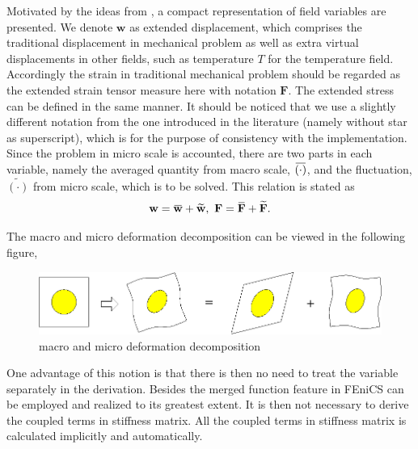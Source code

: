 \documentclass[10pt,a4paper]{scrreprt}
\newcommand{\overbar}[1]{\mkern 1.5mu\overline{\mkern-1.5mu#1\mkern-1.5mu}\mkern 1.5mu}
\begin{document}
Motivated by the ideas from \citep{miehe_homogenization_2016}, a compact representation of field variables are presented. We denote $\mathbf{w}$ as extended displacement, which comprises the traditional displacement in mechanical problem as well as extra virtual displacements in other fields, such as temperature $T$ for the temperature field. Accordingly the strain in traditional mechanical problem should be regarded as the extended strain tensor measure here with notation $\mathbf{F}$. The extended stress can be defined in the same manner. It should be noticed that we use a slightly different notation from the one introduced in the literature \citep{miehe_homogenization_2016} (namely without star as superscript), which is for the purpose of consistency with the implementation. Since the problem in micro scale is accounted, there are two parts in each variable, namely the averaged quantity from macro scale, $\overbar{(\cdot)}$, and the fluctuation, $\widetilde{(\cdot)}$ from micro scale, which is to be solved. This relation is stated as
\begin{equation}
\label{eq: decomp}
\mathbf{w} = \overbar{\mathbf{w}} + \widetilde{\mathbf{w}}, \ \mathbf{F} = \overbar{\mathbf{F}} + \widetilde{\mathbf{F}}.
\end{equation}

The macro and micro deformation decomposition can be viewed in the following figure,
\begin{figure}[h]
  \centering
    \label{fig: mima}
    \includegraphics[width=0.8\linewidth]{../pics/mima.png}
  \caption{macro and micro deformation decomposition}
\end{figure}

One advantage of this notion is that there is then no need to treat the variable separately in the derivation. Besides the merged function feature in FEniCS can be employed and realized to its greatest extent. It is then not necessary to derive the coupled terms in stiffness matrix. All the coupled terms in stiffness matrix is calculated implicitly and automatically.
\end{document}
